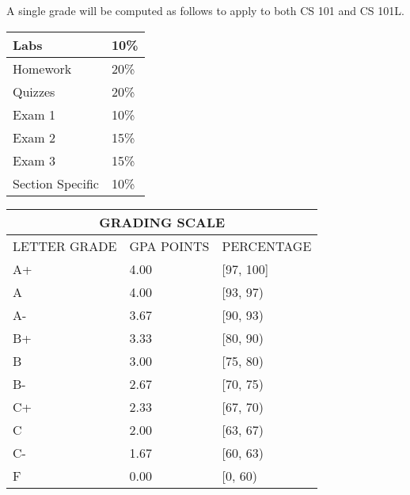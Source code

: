\documentclass[a4paper]{article}
\begin{document}
A single grade will be computed as follows to apply to both CS 101 and CS 101L.

\begin{tabular}{|l|l|}
\hline
Labs & 10\% \\\hline
Homework & 20\% \\\hline
Quizzes &	20\% \\\hline
Exam 1 & 10\%\\\hline
Exam 2 & 15\%\\\hline
Exam 3 & 15\%\\\hline
Section Specific & 10\%\\\hline
\end{tabular}
\begin{tabular}{|l|l|l|}
  \hline
  \multicolumn{3}{|c|}{\bf GRADING SCALE}\\\hline
  LETTER GRADE & GPA POINTS & PERCENTAGE\\\hline
  A+ & 4.00 & [97, 100] \\\hline
  A & 4.00 & [93, 97) \\\hline
  A- & 3.67 & [90, 93) \\\hline
  B+ & 3.33 & [80, 90) \\\hline
  B & 3.00 & [75, 80) \\\hline
  B- & 2.67 & [70, 75) \\\hline
  C+ & 2.33 & [67, 70) \\\hline
  C & 2.00 & [63, 67) \\\hline
  C- & 1.67 & [60, 63) \\\hline
  F & 0.00 & [0, 60)\\\hline
\end{tabular}



\end{document}
